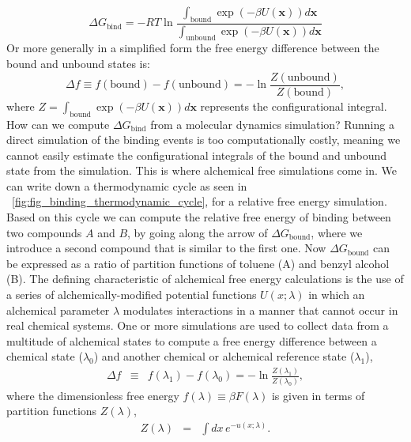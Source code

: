 \documentclass[9pt,bestpractices]{livecoms}
\begin{document}
\begin{equation}
    \Delta G_{\mathrm{bind}} = -RT\ln\frac{\int_\mathrm{bound} \exp(-\beta U(\mathbf{x}))d\mathbf{x}}{\int_\mathrm{unbound} \exp(-\beta U(\mathbf{x}))d\mathbf{x}}
\end{equation}
Or more generally in a simplified form the free energy difference between the bound and unbound states is:
\begin{equation}
\Delta f \equiv f(\mathrm{bound}) - f(\mathrm{unbound}) = -\ln\frac{Z(\mathrm{unbound})}{Z({\mathrm{bound}})},
\end{equation}
where $Z = \int_\mathrm{bound} \exp(-\beta U(\mathbf{x}))d\mathbf{x}$ represents the configurational integral. 
How can we compute $\Delta G_{\mathrm{bind}}$ from a molecular dynamics simulation? Running a direct simulation of the binding events is too computationally costly, meaning we cannot easily estimate the configurational integrals of the bound and unbound state from the simulation. This is where alchemical free simulations come in. We can write down a thermodynamic cycle as seen in ~\ref{fig:fig_binding_thermodynamic_cycle}, for a relative free energy simulation. Based on this cycle we can compute the relative free energy of binding between two compounds $A$ and $B$, by going along the arrow of $\Delta G_{\mathrm{bound}}$, where we introduce a second compound that is similar to the first one. Now $\Delta G_{\mathrm{bound}}$ can be expressed as a ratio of partition functions of toluene (A) and benzyl alcohol (B). 
The defining characteristic of alchemical free energy calculations is the use of a series of alchemically-modified potential functions $U(x; \lambda)$ in which an alchemical parameter $\lambda$ modulates interactions in a manner that cannot occur in real chemical systems.
One or more simulations are used to collect data from a multitude of alchemical states to compute a free energy difference between a chemical state ($\lambda_0$) and another chemical or alchemical reference state ($\lambda_1$),
\begin{eqnarray}
\Delta f &\equiv& f(\lambda_1) - f(\lambda_0) = - \ln \frac{Z(\lambda_1)}{Z(\lambda_0)} , \label{equation:dimensionless-free-energy-difference}
\end{eqnarray}
where the dimensionless free energy $f(\lambda) \equiv \beta F(\lambda)$ is given in terms of partition functions $Z(\lambda)$,
\begin{eqnarray}
Z(\lambda) &=& \int dx \, e^{-u(x; \lambda)} .
\label{equation:partition-function-definition}
\end{eqnarray}
\end{document}
